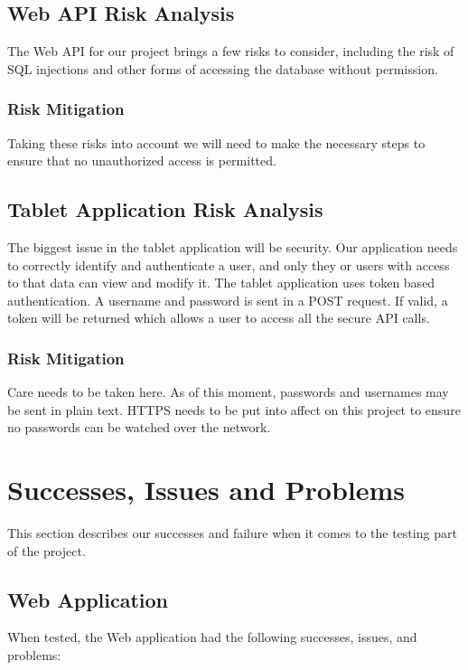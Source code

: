 \subsection{Web API Risk Analysis}
The Web API for our project brings a few risks to consider, including the risk of SQL injections and other forms of accessing the database without permission.

\subsubsection{Risk Mitigation}
Taking these risks into account we will need to make the necessary steps to ensure that no unauthorized access is permitted.

\subsection{Tablet Application Risk Analysis}
The biggest issue in the tablet application will be security.  Our application needs to correctly identify and authenticate a user, and only they or users with access to that data can view and modify it.  The tablet application uses token based authentication.  A username and password is sent in a POST request.  If valid, a token will be returned which allows a user to access all the secure API calls.



\subsubsection{Risk Mitigation}
Care needs to be taken here. As of this moment, passwords and usernames may be sent in plain text.  HTTPS needs to be put into affect on this project to ensure no passwords can be watched over the network.

\section{Successes, Issues and Problems}

This section describes our successes and failure when it comes to the testing part of the project.

\subsection{Web Application}
When tested, the Web application had the following successes, issues, and problems:\\\\
